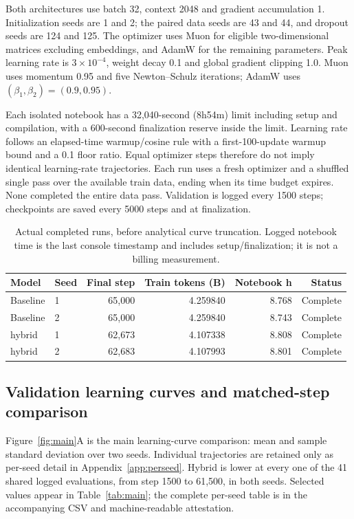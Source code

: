 \documentclass[10pt,a4paper]{article}
\begin{document}
Both architectures use batch 32, context 2048 and gradient accumulation 1. Initialization
seeds are 1 and 2; the paired data seeds are 43 and 44, and dropout seeds are 124 and 125.
The optimizer uses Muon \cite{muon} for eligible two-dimensional matrices excluding embeddings,
and AdamW for the remaining parameters. Peak learning rate is $3\times10^{-4}$, weight
decay 0.1 and global gradient clipping 1.0. Muon uses momentum 0.95 and five Newton--Schulz
iterations; AdamW uses $(\beta_1,\beta_2)=(0.9,0.95)$.

Each isolated notebook has a 32,040-second (8h54m) limit including setup and compilation,
with a 600-second finalization reserve inside the limit. Learning rate follows an
elapsed-time warmup/cosine rule with a first-100-update warmup bound and a 0.1 floor ratio.
Equal optimizer steps therefore do not imply identical learning-rate trajectories.
Each run uses a fresh optimizer and a shuffled single pass over the available train data,
ending when its time budget expires. None completed the entire data pass. Validation is
logged every 1500 steps; checkpoints are saved every 5000 steps and at finalization.

\begin{table}[htbp]\centering\small
\caption{Actual completed runs, before analytical curve truncation. Logged notebook time
is the last console timestamp and includes setup/finalization; it is not a billing measurement.}
\label{tab:runs}
\begin{tabular}{llrrrr}\toprule Model&Seed&Final step&Train tokens (B)&Notebook h&Status\\\midrule
Baseline&1&65,000&4.259840&8.768&Complete\\
Baseline&2&65,000&4.259840&8.743&Complete\\
hybrid&1&62,673&4.107338&8.808&Complete\\
hybrid&2&62,683&4.107993&8.801&Complete\\\bottomrule
\end{tabular}\end{table}

\subsection{Validation learning curves and matched-step comparison}
Figure~\ref{fig:main}A is the main learning-curve comparison: mean and sample standard
deviation over two seeds. Individual trajectories are retained only as per-seed detail
in Appendix~\ref{app:perseed}.
Hybrid is lower at every one of the 41 shared logged evaluations, from step 1500 to 61,500,
in both seeds. Selected values appear in Table~\ref{tab:main}; the complete per-seed table
is in the accompanying CSV and machine-readable attestation.
\end{document}
